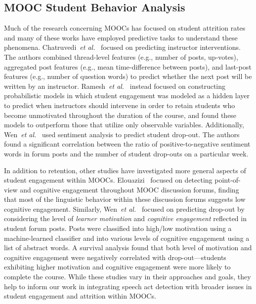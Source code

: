\documentclass[twoside]{article}
\begin{document}
\subsection{MOOC Student Behavior Analysis}
Much of the research concerning MOOCs has focused on student attrition rates and many of these works have employed predictive tasks to understand these phenomena. Chatruvedi~\emph{et al.}~\cite{chaturvedipredicting} focused on predicting instructor interventions. The authors combined thread-level features (e.g., number of posts, up-votes), aggregated post features (e.g., mean time-difference between posts), and last-post features (e.g., number of question words) to predict whether the next post will be written by an instructor. Ramesh~\emph{et al.}~\cite{ramesh2014uncovering} instead focused on constructing probabilistic models in which student engagement was modeled as a hidden layer to predict when instructors should intervene in order to retain students who become unmotivated throughout the duration of the course, and found these models to outperform those that utilize only observable variables. Additionally, Wen~\emph{et al.}~\cite{wen2014sentiment} used sentiment analysis to predict student drop-out. The authors found a significant correlation between the ratio of positive-to-negative sentiment words in forum posts and the number of student drop-outs on a particular week. 
\par
In addition to retention, other studies have investigated more general aspects of student engagement within MOOCs. Elouazizi~\cite{elouazizi2014point} focused on detecting point-of-view and cognitive engagement throughout MOOC discussion forums, finding that most of the linguistic behavior within these discussion forums suggests low cognitive engagement. Similarly, Wen~\emph{et al.}~\cite{wen2014linguistic} focused on predicting drop-out by considering the level of \emph{learner motivation} and \emph{cognitive engagement} reflected in student forum posts. Posts were classified into high/low motivation using a machine-learned classifier and into various levels of cognitive engagement using a list of abstract words. A survival analysis found that both level of motivation and cognitive engagement were negatively correlated with drop-out---students exhibiting higher motivation and cognitive engagement were more likely to complete the course. While these studies vary in their approaches and goals, they help to inform our work in integrating speech act detection with broader issues in student engagement and attrition within MOOCs.
\end{document}
